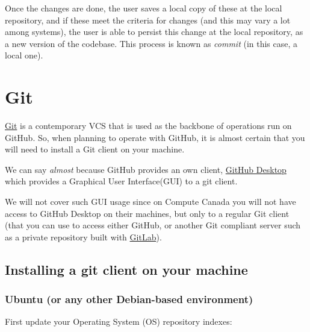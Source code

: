 \documentclass[
]{book}
\newenvironment{Shaded}{\begin{snugshade}}{\end{snugshade}}
\newcommand{\ExtensionTok}[1]{#1}
\newcommand{\NormalTok}[1]{#1}
\begin{document}
Once the changes are done, the user saves a local copy of these at the local repository,
and if these meet the criteria for changes (and this may vary a lot among systems),
the user is able to persist this change at the local repository, as a new version of
the codebase. This process is known as \emph{commit} (in this case, a local one).

\hypertarget{git}{%
\section{Git}\label{git}}

\href{https://git-scm.com/}{Git} is a contemporary VCS that is used as the backbone
of operations run on GitHub. So, when planning to operate with GitHub, it is
almost certain that you will need to install a Git client on your machine.

We can say \emph{almost} because GitHub provides an own client,
\href{https://desktop.github.com/}{GitHub Desktop} which provides a Graphical User
Interface(GUI) to a git client.

We will not cover such GUI usage since on Compute Canada you will not have access
to GitHub Desktop on their machines, but only to
a regular Git client (that you can use to access either GitHub, or another Git
compliant server such as a private repository built with
\href{https://about.gitlab.com/}{GitLab}).

\hypertarget{installing-a-git-client-on-your-machine}{%
\subsection{Installing a git client on your machine}\label{installing-a-git-client-on-your-machine}}

\hypertarget{ubuntu-or-any-other-debian-based-environment}{%
\subsubsection{Ubuntu (or any other Debian-based environment)}\label{ubuntu-or-any-other-debian-based-environment}}

First update your Operating System (OS) repository indexes:

\begin{Shaded}
\end{Shaded}
\end{document}
